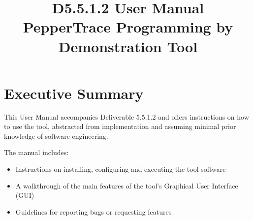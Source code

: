 \documentclass{CSSRforAfrica}
\begin{document}



\title{
D5.5.1.2  User Manual \\ PepperTrace Programming by Demonstration Tool
}


\partner{}                                %




\maketitle
 

\section*{Executive Summary}
\label{executive_summary}
 
\hspace{0.5cm}This User Manual accompanies Deliverable 5.5.1.2 and offers instructions on how to use the tool, abstracted from implementation and assuming minimal prior knowledge of software engineering. 

\vspace{0.4cm}
The manual includes:
\begin{itemize}
    \item Instructions on installing, configuring and executing the tool software
    \item A walkthrough of the main features of the tool's Graphical User Interface (GUI)
    \item Guidelines for reporting bugs or requesting features 
\end{itemize}
\end{document}
